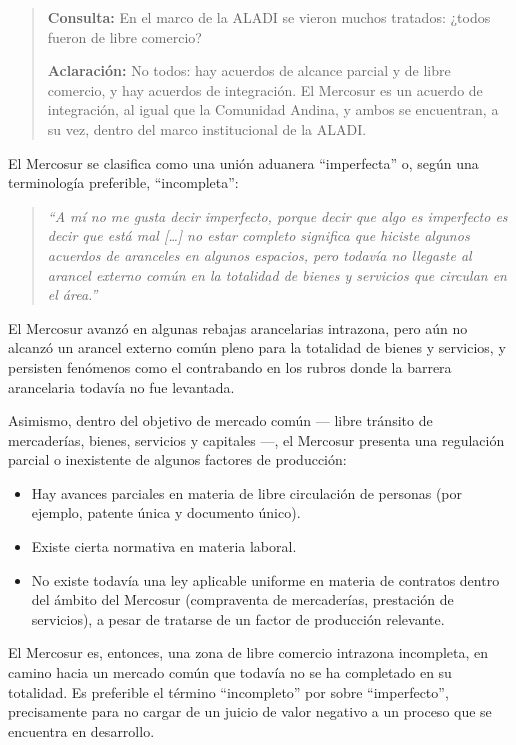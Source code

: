 \documentclass[12pt,oneside]{book}
\begin{document}
\begin{quote}
\small
\textbf{Consulta:} En el marco de la ALADI se vieron muchos tratados: ¿todos fueron de libre comercio?

\textbf{Aclaración:} No todos: hay acuerdos de alcance parcial y de libre comercio, y hay acuerdos de integración. El Mercosur es un acuerdo de integración, al igual que la Comunidad Andina, y ambos se encuentran, a su vez, dentro del marco institucional de la ALADI.
\end{quote}

El Mercosur se clasifica como una unión aduanera ``imperfecta'' o, según una terminología preferible, ``incompleta'':

\begin{quote}
\itshape ``A mí no me gusta decir imperfecto, porque decir que algo es imperfecto es decir que está mal [\ldots] no estar completo significa que hiciste algunos acuerdos de aranceles en algunos espacios, pero todavía no llegaste al arancel externo común en la totalidad de bienes y servicios que circulan en el área.''
\end{quote}

El Mercosur avanzó en algunas rebajas arancelarias intrazona, pero aún no alcanzó un arancel externo común pleno para la totalidad de bienes y servicios, y persisten fenómenos como el contrabando en los rubros donde la barrera arancelaria todavía no fue levantada.

Asimismo, dentro del objetivo de mercado común --- libre tránsito de mercaderías, bienes, servicios y capitales ---, el Mercosur presenta una regulación parcial o inexistente de algunos factores de producción:

\begin{itemize}
    \item Hay avances parciales en materia de libre circulación de personas (por ejemplo, patente única y documento único).
    \item Existe cierta normativa en materia laboral.
    \item No existe todavía una ley aplicable uniforme en materia de contratos dentro del ámbito del Mercosur (compraventa de mercaderías, prestación de servicios), a pesar de tratarse de un factor de producción relevante.
\end{itemize}

\begin{important}
El Mercosur es, entonces, una zona de libre comercio intrazona incompleta, en camino hacia un mercado común que todavía no se ha completado en su totalidad. Es preferible el término ``incompleto'' por sobre ``imperfecto'', precisamente para no cargar de un juicio de valor negativo a un proceso que se encuentra en desarrollo.
\end{important}
\end{document}
